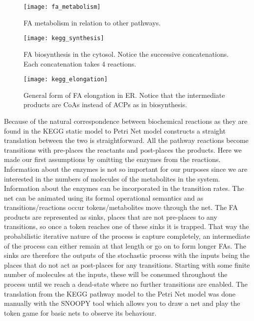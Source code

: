 \begin{figure}[htbp!]
\centering
\texttt{[image: fa\_metabolism]}
\caption[FA metabolism]{FA metabolism in relation to other pathways.}
\label{fig:fa_synthesis}
\end{figure}

\begin{figure}[htbp!]
\centering
\texttt{[image: kegg\_synthesis]}
\caption[Fatty Acid biosynthsis in cytosol]{FA biosynthesis in the
  cytosol. Notice the successive concatenations. Each concatenation
  takes 4 reactions.}
\label{fig:kegg_synthesis}
\end{figure}

\begin{figure}[htbp!]
\centering
\texttt{[image: kegg\_elongation]}
\caption[Fatty Acid elongation in ER]{General form of FA elongation in
ER. Notice that the intermediate products are CoAs instead of ACPs as
in biosynthesis.}
\label{fig:kegg_elongation}
\end{figure}

Because of the natural correspondence between biochemical reactions as
they are found in the KEGG static model to Petri Net model constructs
a straight translation between the two is straightforward. All the
pathway reactions become transitions with pre-places the reactants and
post-places the products. Here we made our first assumptions by
omitting the enzymes from the reactions. Information about the enzymes
is not so important for our purposes since we are interested in the
numbers of molecules of the metabolites in the system. Information
about the enzymes can be incorporated in the transition rates.
The net can be animated using its formal
operational semantics and as transitions/reactions occur
tokens/metabolites move through the net. The FA products are
represented as sinks, places that are not pre-places to any
transitions, so once a token reaches one of these sinks it is
trapped. That way the probabilistic iterative nature of the process is
capture completely, an intermediate of the process can either remain
at that length or go on to form longer FAs. The sinks are therefore
the outputs of the stochastic process with the inputs being the places
that do not act as post-places for any transitions. Starting with some
finite number of molecules at the inputs, these will be consumed
throughout the process until we reach a dead-state where no further
transitions are enabled. The translation from the KEGG pathway model
to the Petri Net model was done manually with the SNOOPY \cite []
{heiner2012snoopy}tool which
allows you to draw a net and play the token game for basic nets to
observe its behaviour.

